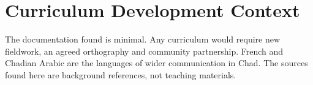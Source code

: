 \documentclass[12pt]{article}
\begin{document}
\section{Curriculum Development Context}
The documentation found is minimal. Any curriculum would require new fieldwork, an agreed orthography and community partnership. French and Chadian Arabic are the languages of wider communication in Chad. The sources found here are background references, not teaching materials.
\end{document}
